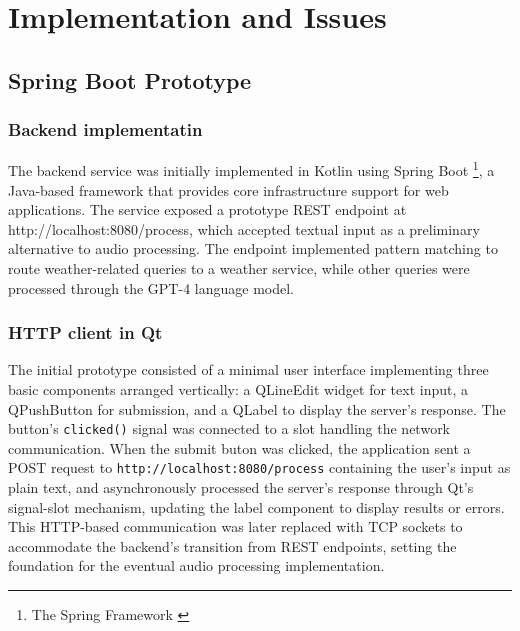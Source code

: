 \renewcommand*\chapterpagestyle{scrheadings}
\chapter{Implementation and Issues}

\section{Spring Boot Prototype}
\subsection{Backend implementatin}
The backend service was initially implemented in Kotlin using Spring Boot \footnote{The Spring Framework \cite{spring}},
a Java-based framework that provides core infrastructure support for web applications.
The service exposed a prototype REST endpoint at http://localhost:8080/process,
which accepted textual input as a preliminary alternative to audio processing. 
The endpoint implemented pattern matching to route weather-related queries to a weather service,
while other queries were processed through the GPT-4 language model.

\subsection{HTTP client in Qt}
The initial prototype consisted of a minimal user interface
implementing three basic components arranged vertically:
a QLineEdit widget for text input,
a QPushButton for submission,
and a QLabel to display the server's response.
The button's \texttt{clicked()} signal was connected to a slot
handling the network communication.
When the submit buton was clicked, the application sent a POST request
to \texttt{http://localhost:8080/process} containing the user's input as plain text,
and asynchronously processed the server's response through Qt's signal-slot mechanism,
updating the label component to display results or errors.
This HTTP-based communication was later replaced with TCP sockets
to accommodate the backend's transition from REST endpoints,
setting the foundation for the eventual audio processing implementation.
